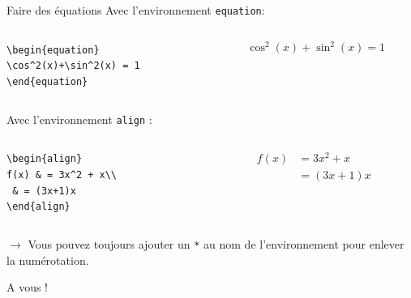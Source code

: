 \documentclass[handout]{beamer}
\begin{document}
\begin{frame}[fragile]{Faire des équations}
Avec l'environnement \texttt{equation}:\\[11pt]
\begin{columns}
	\begin{column}{0.5\textwidth}
	\verb|\begin{equation}|\\
	\verb|\cos^2(x)+\sin^2(x) = 1|\\
	\verb|\end{equation}|	
\end{column}
\begin{column}{0.5\textwidth}
\begin{equation}
\cos^2(x)+\sin^2(x) = 1
\end{equation}\end{column}
\end{columns}
Avec l'environnement \texttt{align} :\\[11pt]
\begin{columns}
	\begin{column}{0.5\textwidth}
\verb|\begin{align}|\\
\verb|f(x) & = 3x^2 + x\\|\\
\verb| & = (3x+1)x|\\
\verb|\end{align}|	

\end{column}
\begin{column}{0.5\textwidth}
\begin{align}
f(x) & = 3x^2 + x\\
& = (3x+1)x
\end{align}
\end{column}
\end{columns}
\vfill
$\rightarrow$ Vous pouvez toujours ajouter un \texttt{*} au nom de l'environnement pour enlever la numérotation.
\end{frame}
\begin{frame}{A vous !}

\end{frame}
\end{document}

